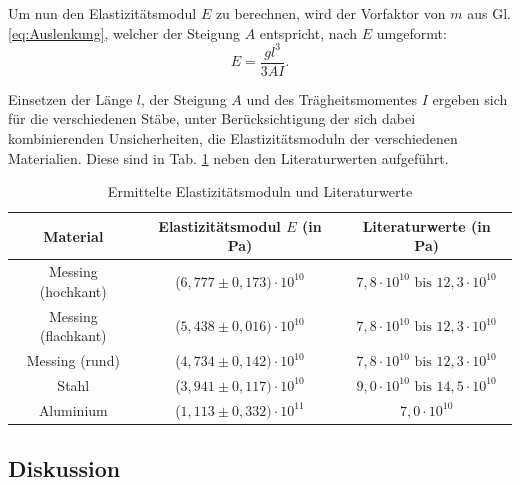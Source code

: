 	Um nun den Elastizitätsmodul $E$ zu berechnen, wird der Vorfaktor von $m$ aus Gl. \ref{eq:Auslenkung}, welcher der Steigung $A$ entspricht, nach $E$ umgeformt:
	\begin{equation}
	E = \frac{gl^3}{3AI}.
	\end{equation}
	
	Einsetzen der Länge $l$, der Steigung $A$ und des Trägheitsmomentes $I$ ergeben sich für die verschiedenen Stäbe, unter Berücksichtigung der sich dabei kombinierenden Unsicherheiten, die Elastizitätsmoduln der verschiedenen Materialien. Diese sind in Tab. \ref{tab:Elastizitätsmoduln} neben den Literaturwerten aufgeführt.
	\begin{table}[ht]
		\caption{Ermittelte Elastizitätsmoduln und Literaturwerte}
		\centering
		\label{tab:Elastizitätsmoduln}
		\begin{tabular}{c|c|c}
			{Material} & {Elastizitätsmodul $E$ (in Pa)} & {Literaturwerte (in Pa)} \\
			\hline
			{Messing (hochkant)} & {($6,777\pm 0,173)\cdot 10^{10}$} & {$7,8\cdot 10^{10} \text{ bis } 12,3\cdot 10^{10}$} \\
			{Messing (flachkant)} & {($5,438\pm 0,016)\cdot 10^{10}$} & {$7,8\cdot 10^{10} \text{ bis } 12,3\cdot 10^{10}$} \\
			{Messing (rund)} & {($4,734\pm 0,142)\cdot 10^{10}$} & {$7,8\cdot 10^{10} \text{ bis } 12,3\cdot 10^{10}$} \\
			{Stahl} & {($3,941\pm 0,117)\cdot 10^{10}$} & {$9,0\cdot 10^{10} \text{ bis } 14,5\cdot 10^{10}$} \\
			{Aluminium} & {($1,113\pm 0,332)\cdot 10^{11}$} & {$7,0\cdot 10^{10}$} \\	
		\end{tabular}
	\end{table}
	
	\subsection{Diskussion}
	
